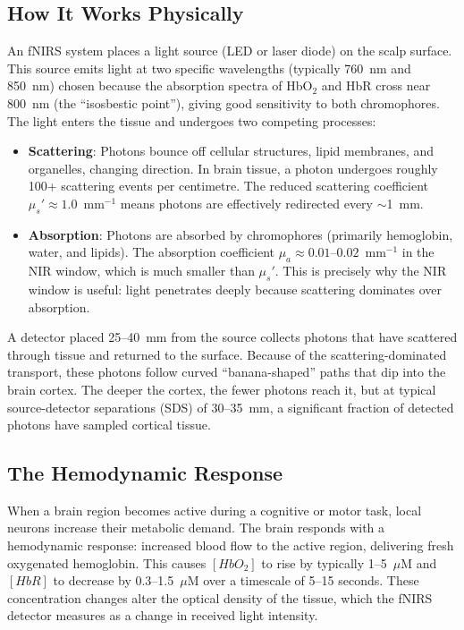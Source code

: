\documentclass[12pt]{article}
\def\text#1{#1}%
\begin{document}
\subsection{How It Works Physically}

An fNIRS system places a light source (LED or laser diode) on the scalp surface. This source emits light at two specific wavelengths (typically 760~nm and 850~nm) chosen because the absorption spectra of HbO$_2$ and HbR cross near 800~nm (the ``isosbestic point''), giving good sensitivity to both chromophores. The light enters the tissue and undergoes two competing processes:

\begin{itemize}
\item \textbf{Scattering}: Photons bounce off cellular structures, lipid membranes, and organelles, changing direction. In brain tissue, a photon undergoes roughly 100+ scattering events per centimetre. The reduced scattering coefficient $\mu_s' \approx 1.0$~mm$^{-1}$ means photons are effectively redirected every $\sim$1~mm.
\item \textbf{Absorption}: Photons are absorbed by chromophores (primarily hemoglobin, water, and lipids). The absorption coefficient $\mu_a \approx 0.01$--$0.02$~mm$^{-1}$ in the NIR window, which is much smaller than $\mu_s'$. This is precisely why the NIR window is useful: light penetrates deeply because scattering dominates over absorption.
\end{itemize}

A detector placed 25--40~mm from the source collects photons that have scattered through tissue and returned to the surface. Because of the scattering-dominated transport, these photons follow curved ``banana-shaped'' paths that dip into the brain cortex. The deeper the cortex, the fewer photons reach it, but at typical source-detector separations (SDS) of 30--35~mm, a significant fraction of detected photons have sampled cortical tissue.

\subsection{The Hemodynamic Response}

When a brain region becomes active during a cognitive or motor task, local neurons increase their metabolic demand. The brain responds with a hemodynamic response: increased blood flow to the active region, delivering fresh oxygenated hemoglobin. This causes $[\text{HbO}_2]$ to rise by typically 1--5~$\mu$M and $[\text{HbR}]$ to decrease by 0.3--1.5~$\mu$M over a timescale of 5--15 seconds. These concentration changes alter the optical density of the tissue, which the fNIRS detector measures as a change in received light intensity.
\end{document}
